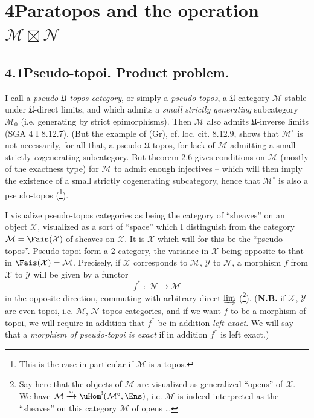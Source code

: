 

\section*{4\quad Paratopos and the operation $\mathcal{M}\boxtimes\mathcal{N}$}

\subsection*{4.1\quad Pseudo-topoi. Product problem.}

I call a \textit{pseudo-$\mathfrak{U}$-topos category}, or simply a \textit{pseudo-topos}, a $\mathfrak{U}$-category $\mathcal{M}$ stable under $\mathfrak{U}$-direct limits, and which admits a \textit{small} \textit{strictly generating} subcategory $\mathcal{M}_0$ (i.e. generating by strict epimorphisms). Then $\mathcal{M}$ also admits $\mathfrak{U}$-inverse limits (SGA 4 I 8.12.7). (But the example of (Gr), cf. loc. cit. 8.12.9, shows that $\mathcal{M}^\circ$ is not necessarily, for all that, a pseudo-$\mathfrak{U}$-topos, for lack of $\mathcal{M}$ admitting a small strictly \textit{co}generating subcategory. But theorem 2.6 gives conditions on $\mathcal{M}$ (mostly of the exactness type) %
for $\mathcal{M}$ to admit enough injectives -- which will then imply the existence of a small strictly cogenerating subcategory, hence that $\mathcal{M}^\circ$ is also a pseudo-topos (\footnote{This is the case in particular if $\mathcal{M}$ is a topos.}).

I visualize pseudo-topos categories as being the category of ``sheaves'' on an object $\mathcal{X}$, visualized as a sort of ``space'' which I distinguish from the category $\mathcal{M}=\Fais(\mathcal{X})$ of sheaves on $\mathcal{X}$. It is $\mathcal{X}$ which will for this be the ``pseudo-topos''. Pseudo-topoi form a 2-category, the variance in $\mathcal{X}$ being opposite to that in $\Fais(\mathcal{X})=\mathcal{M}$. Precisely, if $\mathcal{X}$ corresponds to $\mathcal{M}$, $\mathcal{Y}$ to $\mathcal{N}$, a morphism $f$ from $\mathcal{X}$ to $\mathcal{Y}$ will be given by a functor
\[
f^* \;:\; \mathcal{N} \longrightarrow \mathcal{M}
\tag*{(4.1.1)}
\]
in the opposite direction, commuting with arbitrary direct $\varinjlim$ (\footnote{Say here that the objects of $\mathcal{M}$ are visualized as generalized ``opens'' of $\mathcal{X}$. We have $\mathcal{M}\xrightarrow{\sim}\uHom^!(\mathcal{M}^\circ,\Ens)$, i.e. $\mathcal{M}$ is indeed interpreted as the ``sheaves'' on this category $\mathcal{M}$ of opens \ldots}). (\textbf{N.B.} if $\mathcal{X}$, $\mathcal{Y}$ are even topoi, i.e. $\mathcal{M}$, $\mathcal{N}$ topos categories, and if we want $f$ to be a morphism of topoi, we will require in addition that $f^*$ be in addition \textit{left exact}. We will say that a \textit{morphism of pseudo-topoi is exact} if in addition $f^*$ is left exact.)

